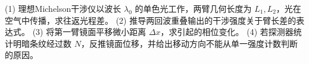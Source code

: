 (1) 理想Michelson干涉仪以波长 \(\lambda_0\) 的单色光工作，两臂几何长度为 \(L_1,L_2\)，光在空气中传播，求往返光程差。
(2) 推导两回波重叠输出的干涉强度关于臂长差的表达式。
(3) 将第一臂镜面平移微小距离 \(\Delta x\)，求引起的相位变化。
(4) 若探测器统计明暗条纹经过数 \(N\)，反推镜面位移，并给出移动方向不能从单一强度计数判断的原因。
